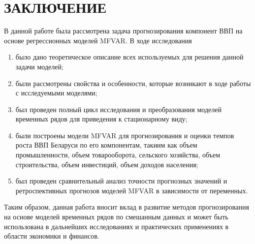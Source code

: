 \documentclass[a4paper, 14pt]{extreport}
\numberwithin{equation}{section}
\numberwithin{equation}{section}
\begin{document}
	\chapter*{ЗАКЛЮЧЕНИЕ}
	В данной работе была рассмотрена задача прогнозирования компонент ВВП на основе регрессионных моделей MFVAR. В ходе исследования
	\begin{enumerate}
		\item было дано теоретическое описание всех используемых для решения данной задачи моделей;
		\item были рассмотрены свойства и особенности, которые возникают в ходе работы с исследуемыми моделями;
		\item был проведен полный цикл исследования и преобразования моделей временных рядов для приведения к стационарному виду;
		\item были построены модели MFVAR для прогнозирования и оценки темпов роста ВВП Беларуси по его компонентам, такиим как объем промышленности, объем товарооборота, сельского хозяйства, объем строительства, объем инвестиций, объем доходов населения;
		\item был проведен сравнительный анализ точности прогнозных значений и ретроспективных прогнозов моделей MFVAR в зависимости от переменных.
	\end{enumerate}
	Таким образом, данная работа вносит вклад в развитие методов прогнозирования на основе моделей временных рядов по смешанным данных и
	может быть использована в дальнейших исследованиях и практических применениях в области экономики и финансов.
	
	
\end{document}
